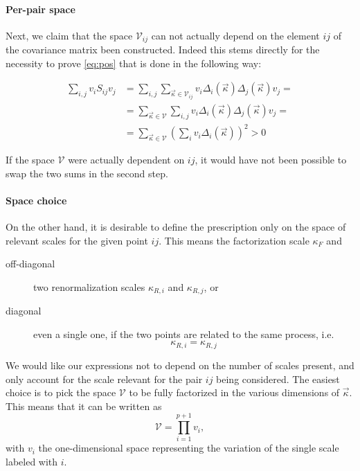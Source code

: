 \paragraph{Per-pair space} Next, we claim that the space $\mathcal{V}_{ij}$ can
not actually depend on the element $ij$ of the covariance matrix been
constructed. Indeed this stems directly for the necessity to prove
\cref{eq:pos} that is done in the following way:

\begin{align}
    \sum_{i,j} v_i S_{ij} v_j &= \sum_{i,j} \sum_{\vec{\kappa} \in \mathcal{V}_{ij}} v_i \Delta_i(\vec{\kappa})\Delta_j(\vec{\kappa}) v_j  =\\
        &= \sum_{\vec{\kappa} \in \mathcal{V}} \sum_{i,j} v_i \Delta_i(\vec{\kappa})\Delta_j(\vec{\kappa}) v_j =\\
        &= \sum_{\vec{\kappa} \in \mathcal{V}} \left(\sum_{i} v_i \Delta_i(\vec{\kappa})\right)^2 > 0
\end{align}

If the space $\mathcal{V}$ were actually dependent on $ij$, it would have not
been possible to swap the two sums in the second step.

\paragraph{Space choice} On the other hand, it is desirable to define the
prescription only on the space of relevant scales for the given point $ij$.
This means the factorization scale $\kappa_F$ and

\begin{description}
    \item[off-diagonal] two renormalization scales $\kappa_{R,i}$ and
        $\kappa_{R,j}$, or
    \item[diagonal] even a single one, if the two points are related to the
        same process, i.e. 
        \begin{equation*}
            \kappa_{R,i} = \kappa_{R,j}
        \end{equation*}
\end{description} 

We would like our expressions not to depend on the number of scales present,
and only account for the scale relevant for the pair $ij$ being considered.
The easiest choice is to pick the space $\mathcal{V}$ to be fully factorized in
the various dimensions of $\vec{\kappa}$. This means that it can be written as
\begin{equation}
\mathcal{V} = \prod_{i = 1}^{p+1} v_{i},
\end{equation}
with $v_{i}$ the one-dimensional space representing the variation of the single
scale labeled with $i$. 
\newline

